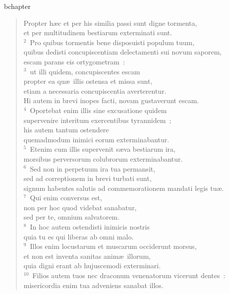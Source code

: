 bchapter\begin{verse}\vspace{-19pt}Propter h\ae c et per his similia passi sunt digne tormenta,\\ et per multitudinem bestiarum exterminati sunt.\\
${}^{2}$~Pro quibus tormentis bene disposuisti populum tuum,\\ quibus dedisti concupiscentiam delectamenti sui novum saporem,\\ escam parans eis ortygometram~:\\
${}^{3}$~ut illi quidem, concupiscentes escam\\ propter ea qu\ae\ illis ostensa et missa sunt,\\ etiam a necessaria concupiscentia averterentur.\\ Hi autem in brevi inopes facti, novam gustaverunt escam.\\
${}^{4}$~Oportebat enim illis sine excusatione quidem\\ supervenire interitum exercentibus tyrannidem~;\\ his autem tantum ostendere\\ quemadmodum inimici eorum exterminabantur.\\
${}^{5}$~Etenim cum illis supervenit s\ae va bestiarum ira,\\ morsibus perversorum colubrorum exterminabantur.\\
${}^{6}$~Sed non in perpetuum ira tua permansit,\\ sed ad correptionem in brevi turbati sunt,\\ signum habentes salutis ad commemorationem mandati legis tu\ae .\\
${}^{7}$~Qui enim conversus est,\\ non per hoc quod videbat sanabatur,\\ sed per te, omnium salvatorem.\\
${}^{8}$~In hoc autem ostendisti inimicis nostris\\ quia tu es qui liberas ab omni malo.\\
${}^{9}$~Illos enim locustarum et muscarum occiderunt morsus,\\ et non est inventa sanitas anim\ae\ illorum,\\ quia digni erant ab hujuscemodi exterminari.\\
${}^{10}$~Filios autem tuos nec draconum venenatorum vicerunt dentes~:\\ misericordia enim tua adveniens sanabat illos.\\

\end{verse}
